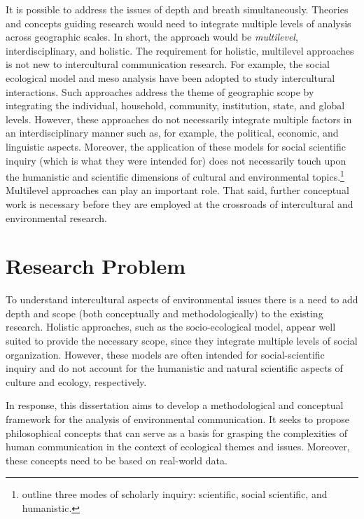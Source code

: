 It is possible to address the issues of depth and breath simultaneously. Theories and concepts guiding research would need to integrate multiple levels of analysis across geographic scales. In short, the approach would be \textit{multilevel}, interdisciplinary, and holistic. The requirement for holistic, multilevel approaches is not new to intercultural communication research. For example, the social ecological model \citep{Brofenbrenner1977a,Brofenbrenner1979a} and meso analysis \citep{Rousseau1944a} have been adopted to study intercultural interactions. Such approaches address the theme of geographic scope by integrating the individual, household, community, institution, state, and global levels. However, these approaches do not necessarily integrate multiple factors in an interdisciplinary manner such as, for example, the political, economic, and linguistic aspects. Moreover, the application of these models for social scientific inquiry (which is what they were intended for) does not necessarily touch upon the humanistic and scientific dimensions of cultural and environmental topics.\footnote{\cite{Littlejohn2011a} outline three modes of scholarly inquiry: scientific, social scientific, and humanistic.} Multilevel approaches can play an important role. That said, further conceptual work is necessary before they are employed at the crossroads of intercultural and environmental research. 

\section{Research Problem}

To understand intercultural aspects of environmental issues there is a need to add depth and scope (both conceptually and methodologically) to the existing research. Holistic approaches, such as the socio-ecological model, appear well suited to provide the necessary scope, since they integrate multiple levels of social organization. However, these models are often intended for social-scientific inquiry and do not account for the humanistic and natural scientific aspects of culture and ecology, respectively. 

In response, this dissertation aims to develop a methodological and conceptual framework for the analysis of environmental communication. It seeks to propose philosophical concepts that can serve as a basis for grasping the complexities of human communication in the context of ecological themes and issues. Moreover, these concepts need to be based on real-world data. 

